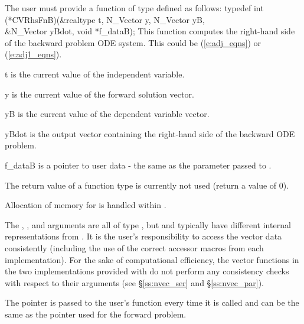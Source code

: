 The user must provide a function of type  defined as follows:
{
  typedef int (*CVRhsFnB)(&realtype t, N\_Vector y, N\_Vector yB, \\
                          &N\_Vector yBdot, void *f\_dataB);
}
{
  This function computes the right-hand side of the backward problem ODE system.
  This could be (\ref{e:adj_eqns}) or (\ref{e:adj1_eqns}).
}
{
  \begin{args}[f\_dataB]
  \item[t]
    is the current value of the independent variable.
  \item[y]
    is the current value of the forward solution vector.
  \item[yB]
    is the current value of the dependent variable vector.
  \item[yBdot]
    is the output vector containing the right-hand side of the backward ODE problem.
  \item[f\_dataB]
    is a pointer to user data - the same as the       
    parameter passed to .   
  \end{args}
}
{
  The return value of a  function type is currently not used
  (return a value of 0).
}
{
  Allocation of memory for  is handled within {\cvodes}.

  The , , and  arguments are all of type ,
  but  and   typically have different internal representations
  from . It is the user's 
  responsibility to access the vector data consistently (including the use of the 
  correct accessor macros from each {\nvector} implementation). For the sake of 
  computational efficiency, the vector functions in the two {\nvector} implementations 
  provided with {\cvodes} do not perform any consistency checks with respect to their 
   arguments (see \S\ref{ss:nvec_ser} and \S\ref{ss:nvec_par}).

  The  pointer is passed to 
  the user's  function every time it is called and can be the same as the 
   pointer used for the forward problem.
}


